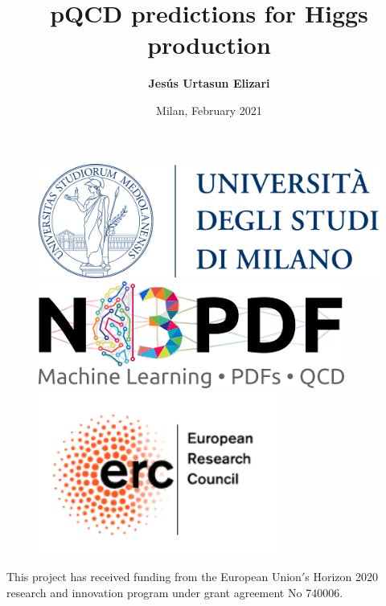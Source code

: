\documentclass[aspectratio=43]{beamer}
\title[Perturbative QCD predictions for Higgs production]{pQCD predictions for Higgs production}
\author{\textbf {Jes\'us Urtasun Elizari}}
\date{Milan, February 2021}
\begin{document}
\begin{frame}

	\vspace{1.0 cm}
	
	
	\vspace{0.25 cm}

	\begin{figure}
		\includegraphics[width = 3.0 cm]{plots/unimi.png}
		\hfill
		\includegraphics[width = 3.0 cm]{plots/n3pdf.png}
		\hfill
		\includegraphics[width = 3.0 cm]{plots/erc.png}
		\endminipage
	\end{figure}

	\vspace{1.0 cm}
	
	{\scriptsize \color{blue} This project has received funding from the European Union$'$s Horizon 2020 research and innovation program under grant agreement No 740006.}

\end{frame}
\end{document}
